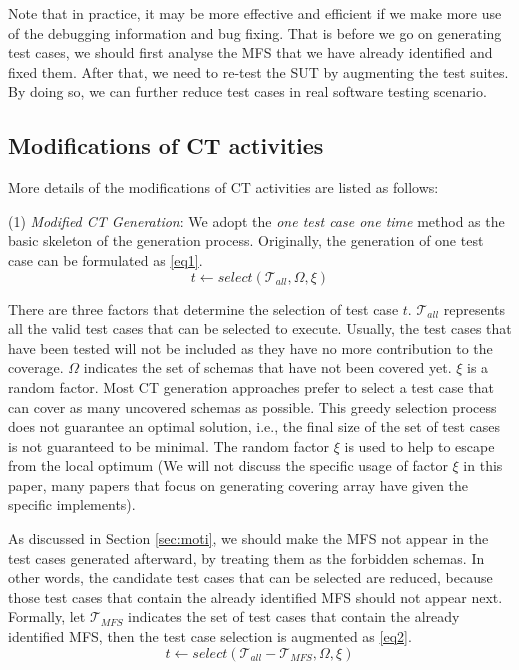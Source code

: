\documentclass[journal,12pt,onecolumn,draftclsnofoot,]{IEEEtran}
\begin{document}
Note that in practice, it may be more effective and efficient if we make more use of the debugging information and bug fixing. That is before we go on generating test cases, we should first analyse the MFS that we have already identified and fixed them. After that, we need to re-test the SUT by augmenting the test suites. By doing so, we can further reduce test cases in real software testing scenario.

\subsection{Modifications of CT activities}\label{sec:app:modi}
More details of the modifications of CT activities are listed as follows:

(1) \emph{Modified CT Generation}:
We adopt the \emph{one test case one time} method as the basic skeleton of the generation process. Originally, the generation of one test case can be formulated as \ref{eq1}.
\begin{displaymath} t \leftarrow  select (\mathcal{T}_{all}, \Omega ,  \xi) \tag{EQ1} \label{eq1} \end{displaymath}

There are three factors that determine the selection of test case $t$. $\mathcal{T}_{all}$ represents all the valid test cases that can be selected to execute. Usually, the test cases that have been tested will not be included as they have no more contribution to the coverage. $\Omega$ indicates the set of schemas that have not been covered yet. $\xi$ is a random factor. Most CT generation approaches prefer to select a test case that can cover as many uncovered schemas as possible. This greedy selection process does not guarantee an optimal solution, i.e., the final size of the set of test cases is not guaranteed to be minimal. The random factor $\xi$ is used to help to escape from the local optimum (We will not discuss the specific usage of factor $\xi$ in this paper, many papers that focus on generating covering array have given the specific implements).



As discussed in Section \ref{sec:moti}, we should make the MFS not appear in the test cases generated afterward, by treating them as the forbidden schemas. In other words, the candidate test cases that can be selected are reduced, because those test cases that contain the already identified MFS should not appear next. Formally,  let $\mathcal{T}_{MFS}$ indicates the set of test cases that contain the already identified MFS, then the test case selection is augmented as \ref{eq2}.
\begin{displaymath} t \leftarrow  select (\mathcal{T}_{all} - \mathcal{T}_{MFS}, \Omega ,  \xi ) \tag{EQ2} \label{eq2} \end{displaymath}
\end{document}
